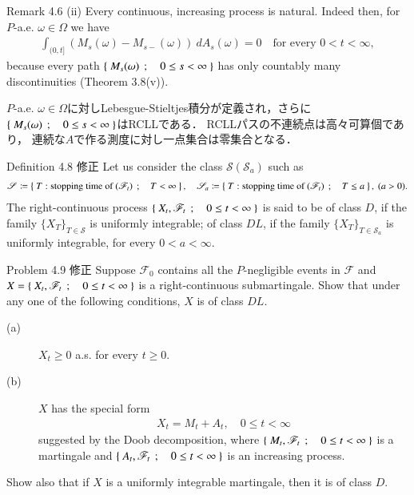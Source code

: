	\begin{itembox}[l]{Remark 4.6 (ii)}
		Every continuous, increasing process is natural. Indeed then, for $P$-a.e. $\omega \in \Omega$
		we have
		\begin{align}
			\int_{(0,t]} (M_s(\omega)-M_{s-}(\omega))\ dA_s(\omega) = 0
			\quad \mbox{for every $0 < t < \infty$},
		\end{align}
		because every path $\left\{\ M_s(\omega)\ \, ; \quad 0 \leq s < \infty\ \right\}$ has only countably many discontinuities
		(Theorem 3.8(v)).
	\end{itembox}
	
	\begin{prf}
		$P$-a.e. $\omega \in \Omega$に対しLebesgue-Stieltjes積分が定義され，さらに
		$\left\{\ M_s(\omega)\ \, ; \quad 0 \leq s < \infty\ \right\}$はRCLLである．
		RCLLパスの不連続点は高々可算個であり，
		連続な$A$で作る測度に対し一点集合は零集合となる．
		\QED
	\end{prf}
	
	\begin{itembox}[l]{Definition 4.8 修正}
		Let us consider the class $\mathscr{S}(\mathscr{S}_a)$ such as
		\begin{align}
			\mathscr{S} \coloneqq \left\{\ T:\mbox{stopping time of $(\mathscr{F}_t)$}\ \, ; \quad T < \infty\ \right\},
			\quad \mathscr{S}_a \coloneqq \left\{\ T:\mbox{stopping time of $(\mathscr{F}_t)$}\ \, ; \quad T \leq a\ \right\},\ (a > 0).
		\end{align}
		The right-continuous process $\left\{\ X_t,\mathscr{F}_t\ \, ; \quad 0 \leq t < \infty\ \right\}$ is said to be 
		of class $D$, if the family $\{X_T\}_{T \in \mathscr{S}}$ is uniformly integrable;
		of class $DL$, if the family $\{X_T\}_{T \in \mathscr{S}_a}$ is uniformly integrable,
		for every $0 < a < \infty$.
	\end{itembox}
	
	\begin{itembox}[l]{Problem 4.9 修正}
		Suppose $\mathscr{F}_0$ contains all the $P$-negligible events in $\mathscr{F}$ and
		$X = \left\{\ X_t,\mathscr{F}_t\ \, ; \quad 0 \leq t < \infty\ \right\}$ is a right-continuous submartingale.
		Show that under any one of the following conditions, $X$ is of class $DL$.
		\begin{description}
			\item[(a)] $X_t \geq 0$ a.s. for every $t \geq 0$.
			\item[(b)] $X$ has the special form
				\begin{align}
					X_t = M_t + A_t, \quad 0 \leq t < \infty
				\end{align}
				suggested by the Doob decomposition, where $\left\{\ M_t,\mathscr{F}_t\ \, ; \quad 0 \leq t < \infty\ \right\}$
				is a martingale and $\left\{\ A_t,\mathscr{F}_t\ \, ; \quad 0 \leq t < \infty\ \right\}$ is an increasing process.
		\end{description}
		Show also that if $X$ is a uniformly integrable martingale, then it is of class $D$.
	\end{itembox}
	
